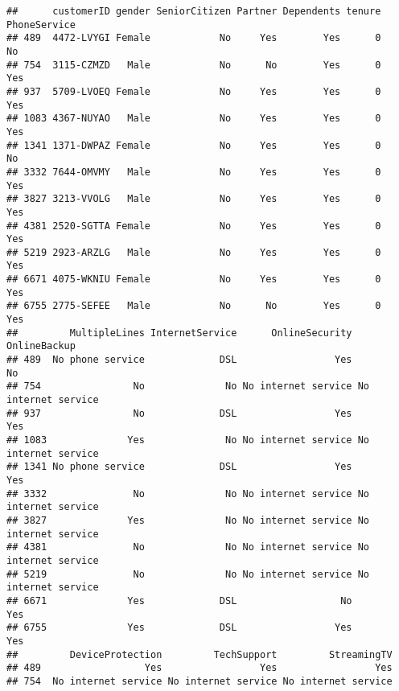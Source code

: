 \documentclass[
  a4paper]{article}
\newenvironment{Shaded}{\begin{snugshade}}{\end{snugshade}}
\newcommand{\FunctionTok}[1]{\textcolor[rgb]{0.13,0.29,0.53}{\textbf{#1}}}
\newcommand{\NormalTok}[1]{#1}
\newcommand{\OtherTok}[1]{\textcolor[rgb]{0.56,0.35,0.01}{#1}}
\newcommand{\SpecialCharTok}[1]{\textcolor[rgb]{0.81,0.36,0.00}{\textbf{#1}}}
\begin{document}
\begin{Shaded}
\end{Shaded}

\begin{verbatim}
##      customerID gender SeniorCitizen Partner Dependents tenure PhoneService
## 489  4472-LVYGI Female            No     Yes        Yes      0           No
## 754  3115-CZMZD   Male            No      No        Yes      0          Yes
## 937  5709-LVOEQ Female            No     Yes        Yes      0          Yes
## 1083 4367-NUYAO   Male            No     Yes        Yes      0          Yes
## 1341 1371-DWPAZ Female            No     Yes        Yes      0           No
## 3332 7644-OMVMY   Male            No     Yes        Yes      0          Yes
## 3827 3213-VVOLG   Male            No     Yes        Yes      0          Yes
## 4381 2520-SGTTA Female            No     Yes        Yes      0          Yes
## 5219 2923-ARZLG   Male            No     Yes        Yes      0          Yes
## 6671 4075-WKNIU Female            No     Yes        Yes      0          Yes
## 6755 2775-SEFEE   Male            No      No        Yes      0          Yes
##         MultipleLines InternetService      OnlineSecurity        OnlineBackup
## 489  No phone service             DSL                 Yes                  No
## 754                No              No No internet service No internet service
## 937                No             DSL                 Yes                 Yes
## 1083              Yes              No No internet service No internet service
## 1341 No phone service             DSL                 Yes                 Yes
## 3332               No              No No internet service No internet service
## 3827              Yes              No No internet service No internet service
## 4381               No              No No internet service No internet service
## 5219               No              No No internet service No internet service
## 6671              Yes             DSL                  No                 Yes
## 6755              Yes             DSL                 Yes                 Yes
##         DeviceProtection         TechSupport         StreamingTV
## 489                  Yes                 Yes                 Yes
## 754  No internet service No internet service No internet service

\end{verbatim}
\end{document}
